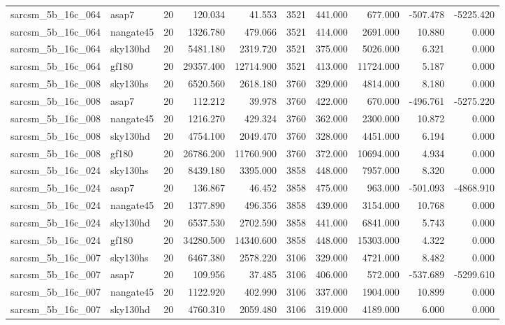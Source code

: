\begin{longtable}{llrrrrrrrr}
sarcsm\_5b\_16c\_064 & asap7 & 20 & 120.034 & 41.553 & 3521 & 441.000 & 677.000 & -507.478 & -5225.420 \\
sarcsm\_5b\_16c\_064 & nangate45 & 20 & 1326.780 & 479.066 & 3521 & 414.000 & 2691.000 & 10.880 & 0.000 \\
sarcsm\_5b\_16c\_064 & sky130hd & 20 & 5481.180 & 2319.720 & 3521 & 375.000 & 5026.000 & 6.321 & 0.000 \\
sarcsm\_5b\_16c\_064 & gf180 & 20 & 29357.400 & 12714.900 & 3521 & 413.000 & 11724.000 & 5.187 & 0.000 \\
sarcsm\_5b\_16c\_008 & sky130hs & 20 & 6520.560 & 2618.180 & 3760 & 329.000 & 4814.000 & 8.180 & 0.000 \\
sarcsm\_5b\_16c\_008 & asap7 & 20 & 112.212 & 39.978 & 3760 & 422.000 & 670.000 & -496.761 & -5275.220 \\
sarcsm\_5b\_16c\_008 & nangate45 & 20 & 1216.270 & 429.324 & 3760 & 362.000 & 2300.000 & 10.872 & 0.000 \\
sarcsm\_5b\_16c\_008 & sky130hd & 20 & 4754.100 & 2049.470 & 3760 & 328.000 & 4451.000 & 6.194 & 0.000 \\
sarcsm\_5b\_16c\_008 & gf180 & 20 & 26786.200 & 11760.900 & 3760 & 372.000 & 10694.000 & 4.934 & 0.000 \\
sarcsm\_5b\_16c\_024 & sky130hs & 20 & 8439.180 & 3395.000 & 3858 & 448.000 & 7957.000 & 8.320 & 0.000 \\
sarcsm\_5b\_16c\_024 & asap7 & 20 & 136.867 & 46.452 & 3858 & 475.000 & 963.000 & -501.093 & -4868.910 \\
sarcsm\_5b\_16c\_024 & nangate45 & 20 & 1377.890 & 496.356 & 3858 & 439.000 & 3154.000 & 10.768 & 0.000 \\
sarcsm\_5b\_16c\_024 & sky130hd & 20 & 6537.530 & 2702.590 & 3858 & 441.000 & 6841.000 & 5.743 & 0.000 \\
sarcsm\_5b\_16c\_024 & gf180 & 20 & 34280.500 & 14340.600 & 3858 & 448.000 & 15303.000 & 4.322 & 0.000 \\
sarcsm\_5b\_16c\_007 & sky130hs & 20 & 6467.380 & 2578.220 & 3106 & 329.000 & 4721.000 & 8.482 & 0.000 \\
sarcsm\_5b\_16c\_007 & asap7 & 20 & 109.956 & 37.485 & 3106 & 406.000 & 572.000 & -537.689 & -5299.610 \\
sarcsm\_5b\_16c\_007 & nangate45 & 20 & 1122.920 & 402.990 & 3106 & 337.000 & 1904.000 & 10.899 & 0.000 \\
sarcsm\_5b\_16c\_007 & sky130hd & 20 & 4760.310 & 2059.480 & 3106 & 319.000 & 4189.000 & 6.000 & 0.000 \\

\end{longtable}

